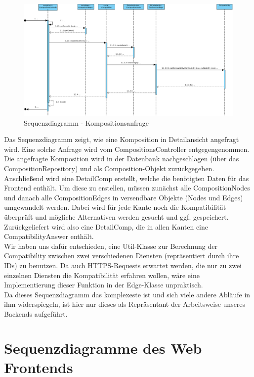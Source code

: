 \begin{figure}[h]
	\centering
	\includegraphics[width=\textwidth]{img/Diagramme/Sequenz/Controller}	
	\caption{Sequenzdiagramm - Kompositionsanfrage}
	\label{fig:sequenz-a}
\end{figure}
\noindent
Das Sequenzdiagramm zeigt, wie eine Komposition in Detailansicht angefragt wird. 
Eine solche Anfrage wird vom CompositionsController entgegengenommen.
Die angefragte Komposition wird in der Datenbank nachgeschlagen (über das CompositionRepository) und als Composition-Objekt zurückgegeben.
Anschließend wird eine DetailComp erstellt, welche die benötigten Daten für das Frontend enthält. 
Um diese zu erstellen, müssen zunächst alle CompositionNodes und danach alle CompositionEdges in versendbare Objekte (Nodes und Edges) umgewandelt werden. 
Dabei wird für jede Kante noch die Kompatibilität überprüft und mögliche Alternativen werden gesucht und ggf. gespeichert. Zurückgeliefert wird also eine DetailComp, die in allen Kanten eine CompatibilityAnswer enthält.\newline
\\ \noindent
Wir haben uns dafür entschieden, eine Util-Klasse zur Berechnung der Compatibility zwischen zwei verschiedenen Diensten (repräsentiert durch ihre IDs) zu benutzen.
Da auch HTTPS-Requests erwartet werden, die nur zu zwei einzelnen Diensten die Kompatibilität erfahren wollen, wäre eine Implementierung dieser Funktion in der Edge-Klasse unpraktisch.\newline
\\ \noindent
Da dieses Sequenzdiagramm das komplexeste ist und sich viele andere Abläufe in ihm widerspiegeln, ist hier nur dieses als Repräsentant der Arbeitsweise unseres Backends aufgeführt.

\section*{Sequenzdiagramme des Web Frontends}
